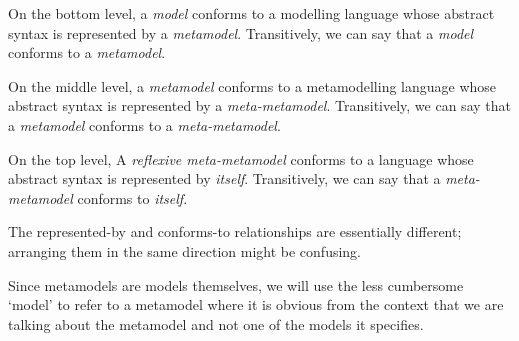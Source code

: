 On the bottom level, a \textit{model} conforms to a modelling language whose abstract syntax is represented by a \textit{metamodel}.
Transitively, we can say that a \textit{model} conforms to a \textit{metamodel}.

On the middle level, a \textit{metamodel} conforms to a metamodelling language whose abstract syntax is represented by a \textit{meta-metamodel}.
Transitively, we can say that a \textit{metamodel} conforms to a \textit{meta-metamodel}.

On the top level, A \textit{reflexive meta-metamodel} conforms to a language whose abstract syntax is represented by \textit{itself}.
Transitively, we can say that a \textit{meta-metamodel} conforms to \textit{itself}.

The represented-by and conforms-to relationships are essentially different; arranging them in the same direction might be confusing.

Since metamodels are models themselves, we will use the less cumbersome `model' to refer to a metamodel where it is obvious from the context that we are talking about the metamodel and not one of the models it specifies.  








